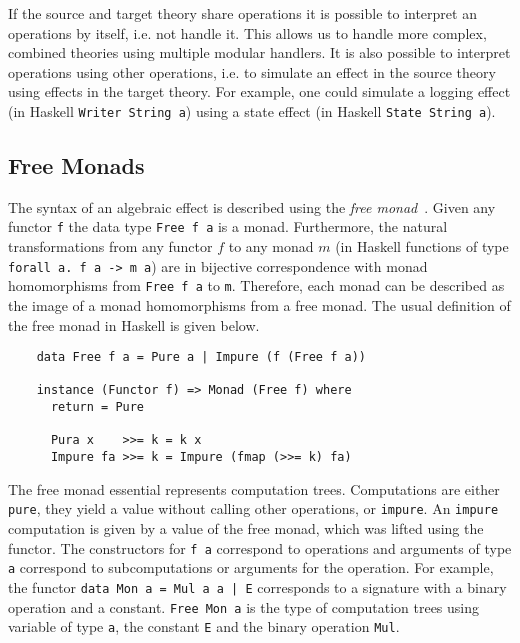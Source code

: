 If the source and target theory share operations it is possible to interpret an
operations by itself, i.e. not handle it.
This allows us to handle more complex, combined theories using multiple modular
handlers.
It is also possible to interpret operations using other operations, i.e. to
simulate an effect in the source theory using effects in the target theory.
For example, one could simulate a logging effect (in Haskell \texttt{Writer String
  a}) using a state effect (in Haskell \texttt{State String a}).


\subsection{Free Monads}
\label{preliminaries:free-monad}

The syntax of an algebraic effect is described using the \textit{free
monad}~\cite{DBLP:journals/jfp/Swierstra08}.
Given any functor \texttt{f} the data type \texttt{Free f a} is a monad.
Furthermore, the natural transformations from any functor $f$ to any monad $m$
(in Haskell functions of type \texttt{forall a. f a -> m a}) are in bijective
correspondence with monad homomorphisms from \texttt{Free f a} to \texttt{m}.
Therefore, each monad can be described as the image of a monad homomorphisms
from a free monad.
The usual definition of the free monad in Haskell is given below.

\begin{verbatim}
    data Free f a = Pure a | Impure (f (Free f a))

    instance (Functor f) => Monad (Free f) where
      return = Pure

      Pura x    >>= k = k x
      Impure fa >>= k = Impure (fmap (>>= k) fa)
\end{verbatim}
The free monad essential represents computation trees.
Computations are either \texttt{pure}, they yield a value without calling
other operations, or \texttt{impure}.
An \texttt{impure} computation is given by a value of the free monad, which was
lifted using the functor.
The constructors for \texttt{f a} correspond to operations and arguments of type
\texttt{a} correspond to subcomputations or arguments for the operation.
For example, the functor \texttt{data Mon a = Mul a a | E}
corresponds to a signature with a binary operation and a constant.
\texttt{Free Mon a} is the type of computation trees using variable
of type \texttt{a}, the constant \texttt{E} and the binary operation
\texttt{Mul}.

